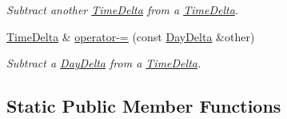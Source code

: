 \begin{DoxyCompactItemize}
\begin{DoxyCompactList}\small\item\em Subtract another \hyperlink{structTimeDelta}{Time\-Delta} from a \hyperlink{structTimeDelta}{Time\-Delta}. \end{DoxyCompactList}\item 
\hyperlink{structTimeDelta}{Time\-Delta} \& \hyperlink{structTimeDelta_a8a8d2796e13a24266d46c54873d57eb2}{operator-\/=} (const \hyperlink{structDayDelta}{Day\-Delta} \&other)
\begin{DoxyCompactList}\small\item\em Subtract a \hyperlink{structDayDelta}{Day\-Delta} from a \hyperlink{structTimeDelta}{Time\-Delta}. \end{DoxyCompactList}\end{DoxyCompactItemize}
\subsection*{Static Public Member Functions}
